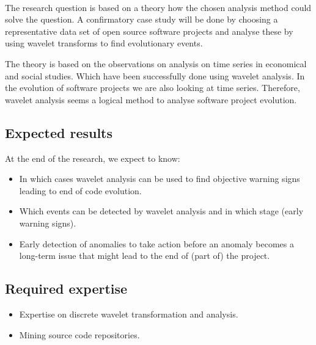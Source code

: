 \paragraph{}
The research question is based on a theory how the chosen analysis method could
solve the question. A confirmatory case study will be done by choosing a
representative data set of open source software projects and analyse these by
using wavelet transforms to find evolutionary events.

The theory is based on the observations on analysis on time series in
economical and social studies. Which have been successfully done using wavelet
analysis. In the evolution of software projects we are also looking at time
series. Therefore, wavelet analysis seems a logical method to analyse software
project evolution.

\subsection{Expected results}
At the end of the research, we expect to know:
\begin{itemize}
	\item In which cases wavelet analysis can be used to find objective warning
	signs leading to end of code evolution.
	\item Which events can be detected by wavelet analysis and in which stage
	(early warning signs).
	\item Early detection of anomalies to take action before an anomaly becomes a
	long-term issue that might lead to the end of (part of) the project.
\end{itemize}

\subsection{Required expertise}
\begin{itemize}
	\item Expertise on discrete wavelet transformation and analysis.
	\item Mining source code repositories.
\end{itemize}

